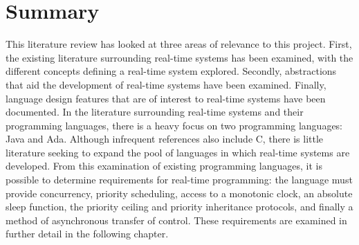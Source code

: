\section{Summary}
This literature review has looked at three areas of relevance to this project.
First, the existing literature surrounding real-time systems has been examined,
with the different concepts defining a real-time system explored. Secondly,
abstractions that aid the development of real-time systems have been examined.
Finally, language design features that are of interest to real-time systems
have been documented. In the literature surrounding real-time systems and their
programming languages, there is a heavy focus on two
programming languages: Java and Ada. Although infrequent references also include C, 
there is little literature seeking to expand the pool of languages in which 
real-time systems are developed. From this examination of existing programming 
languages, it is possible to determine requirements for real-time programming: 
the language must provide concurrency, priority scheduling, access to a monotonic 
clock, an absolute sleep function, the priority ceiling and priority inheritance 
protocols, and finally a method of asynchronous transfer of control. These 
requirements are examined in further detail in the following chapter. 
